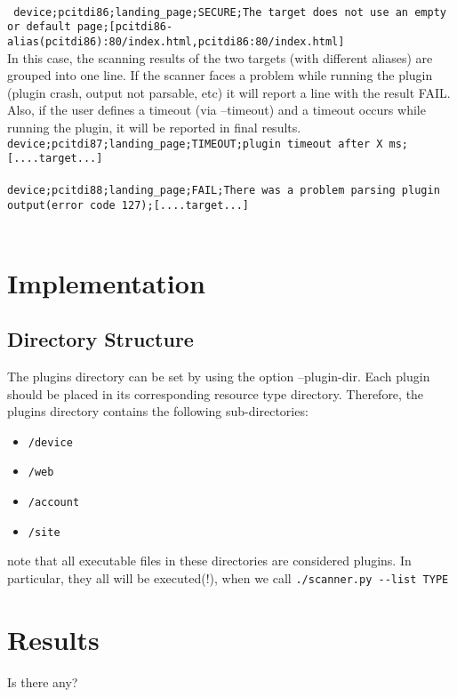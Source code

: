 \\
\texttt{
device;pcitdi86;landing\_page;SECURE;The target does not use an empty or default page;[pcitdi86-alias(pcitdi86):80/index.html,pcitdi86:80/index.html]
}
\\
In this case, the scanning results of the two targets (with different aliases) are grouped into one line.
If the scanner faces a problem while running the plugin (plugin crash, output not parsable, etc) it will report a line with the result FAIL. Also, if the user defines a timeout (via --timeout) and a timeout occurs while running the plugin, it will be reported in final results.
\\ 
\texttt{device;pcitdi87;landing\_page;TIMEOUT;plugin timeout after X ms;[....target...]}
\\
\\
\texttt{device;pcitdi88;landing\_page;FAIL;There was a problem parsing plugin output(error code 127);[....target...]}
\\
\\
\section{Implementation}
\subsection{Directory Structure}
The plugins directory can be set by using the option --plugin-dir. Each plugin should be placed in its corresponding resource type directory. Therefore, the plugins directory contains the following sub-directories:
\begin{itemize}


   \item \texttt{/device}
    \item \texttt{/web}
    \item \texttt{/account}
    \item \texttt{/site} 
    
    \end{itemize}

note that all executable files in these directories are considered plugins. In particular, they all will be executed(!), when we call \texttt{./scanner.py -{}-list TYPE}

\section{Results}
Is there any?



